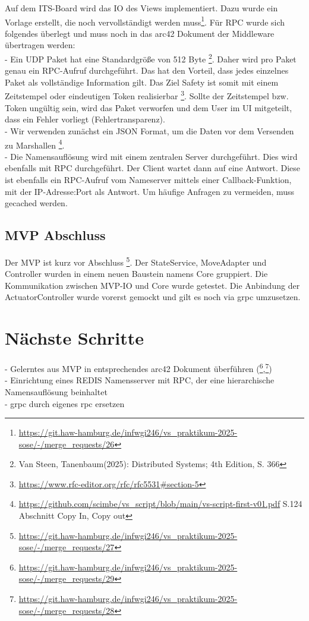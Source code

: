 \documentclass{article}
\begin{document}
Auf dem ITS-Board wird das IO des Views implementiert. Dazu wurde ein Vorlage erstellt, die noch vervollständigt werden muss\footnote{\url{https://git.haw-hamburg.de/infwgi246/vs_praktikum-2025-sose/-/merge_requests/26}}.
Für RPC wurde sich folgendes überlegt und muss noch in das arc42 Dokument der Middleware übertragen werden:\\
- Ein UDP Paket hat eine Standardgröße von 512 Byte \footnote{Van Steen, Tanenbaum(2025): Distributed Systems; 4th Edition, S. 366}. Daher wird pro Paket genau ein RPC-Aufruf durchgeführt.
Das hat den Vorteil, dass jedes einzelnes Paket als vollständige Information gilt. Das Ziel Safety ist somit mit einem Zeitstempel oder eindeutigen Token realisierbar \footnote{\url{https://www.rfc-editor.org/rfc/rfc5531\#section-5}}. Sollte der Zeitstempel bzw. Token ungültig sein, wird das Paket verworfen und dem User im UI mitgeteilt, dass ein Fehler vorliegt (Fehlertransparenz).\\
- Wir verwenden zunächst ein JSON Format, um die Daten vor dem Versenden zu Marshallen \footnote{\url{https://github.com/scimbe/vs_script/blob/main/vs-script-first-v01.pdf} S.124 Abschnitt Copy In, Copy out}. \\
- Die Namensauflösung wird mit einem zentralen Server durchgeführt. Dies wird ebenfalls mit RPC durchgeführt. Der Client wartet dann auf eine Antwort. Diese ist ebenfalls ein RPC-Aufruf vom Nameserver mittels einer Callback-Funktion, mit der IP-Adresse:Port als Antwort. Um häufige Anfragen zu vermeiden, muss gecached werden. 

\subsection{MVP Abschluss}

Der MVP ist kurz vor Abschluss \footnote{\url{https://git.haw-hamburg.de/infwgi246/vs_praktikum-2025-sose/-/merge_requests/27}}.
Der StateService, MoveAdapter und Controller wurden in einem neuen Baustein namens Core gruppiert. 
Die Kommunikation zwischen MVP-IO und Core wurde getestet. Die Anbindung der ActuatorController wurde vorerst gemockt und gilt es noch via grpc umzusetzen.


\section{Nächste Schritte}
- Gelerntes aus MVP in entsprechendes arc42 Dokument überführen (\footnote{\url{https://git.haw-hamburg.de/infwgi246/vs_praktikum-2025-sose/-/merge_requests/29}},\footnote{\url{https://git.haw-hamburg.de/infwgi246/vs_praktikum-2025-sose/-/merge_requests/28}})\\
- Einrichtung eines REDIS Namensserver mit RPC, der eine hierarchische Namensauflösung beinhaltet \\
- grpc durch eigenes rpc ersetzen \\
\end{document}
